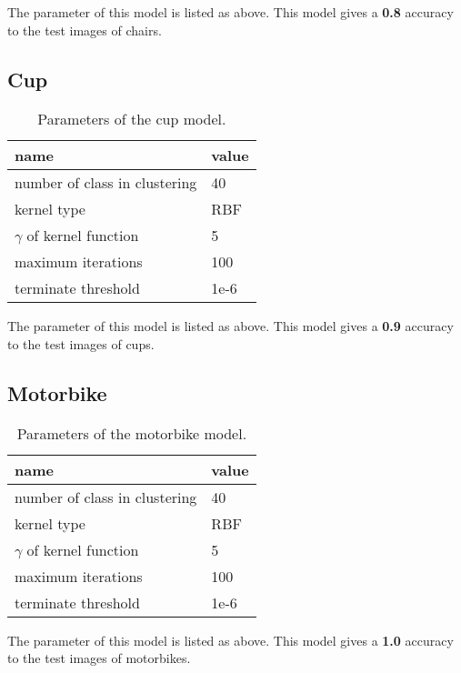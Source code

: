The parameter of this model is listed as above.
This model gives a \textbf{0.8} accuracy to the test images of chairs.


\subsection{Cup}

\begin{table}[H]
\centering

\begin{tabular}{|l|l|}
\hline
\textbf{name}                 & \textbf{value} \\ \hline
number of class in clustering & 40             \\ \hline
kernel type                   & RBF            \\ \hline
$\gamma$ of kernel function   & 5              \\ \hline
maximum iterations            & 100            \\ \hline
terminate threshold           & 1e-6           \\ \hline
\end{tabular}
\caption{Parameters of the cup model.}
\end{table}

The parameter of this model is listed as above.
This model gives a \textbf{0.9} accuracy to the test images of cups.


\subsection{Motorbike}

\begin{table}[H]
\centering

\begin{tabular}{|l|l|}
\hline
\textbf{name}                 & \textbf{value} \\ \hline
number of class in clustering & 40             \\ \hline
kernel type                   & RBF            \\ \hline
$\gamma$ of kernel function   & 5              \\ \hline
maximum iterations            & 100            \\ \hline
terminate threshold           & 1e-6           \\ \hline
\end{tabular}
\caption{Parameters of the motorbike model.}
\end{table}

The parameter of this model is listed as above.
This model gives a \textbf{1.0} accuracy to the test images of motorbikes.

